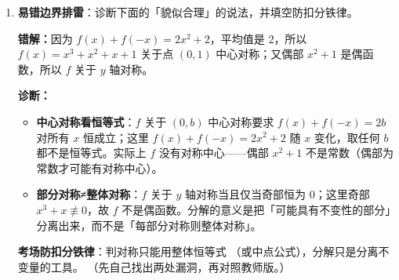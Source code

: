 \begin{tcolorbox}
\begin{enumerate}[label=(\arabic*), itemsep=4pt]
\textbf{与通法对读}：秒判示范——$y=e^x$ 的三种变身：镜像 $e^{-x}$（值域 $(0,+\infty)$ 不变、单调反转）；旋转 $-e^{-x}$（值域 $(-\infty,0)$、单调仍增）；平移 $e^{x-h}+k$（形状不变、对称身份清零）。通法负责逐条验证，表格负责直接读取；考试书写用通法，审题预判用表格。


\item \textbf{易错边界排雷}：诊断下面的「貌似合理」的说法，并填空防扣分铁律。

{\bfseries\color{red!70!black}错解：}因为 $f(x)+f(-x)=2x^2+2$，平均值是 $2$，所以 $f(x)=x^3+x^2+x+1$ 关于点 $(0,1)$ 中心对称；又偶部 $x^2+1$ 是偶函数，所以 $f$ 关于 $y$ 轴对称。

\ifteacher
{\bfseries\color{main}诊断：}
\begin{itemize}[itemsep=1pt]
\item \textbf{中心对称看恒等式}：$f$ 关于 $(0,b)$ 中心对称要求 $f(x)+f(-x)=2b$ 对所有 $x$ 恒成立；这里 $f(x)+f(-x)=2x^2+2$ 随 $x$ 变化，取任何 $b$ 都不是恒等式。实际上 $f$ 没有对称中心——偶部 $x^2+1$ 不是常数（偶部为常数才可能有对称中心）。
\item \textbf{部分对称≠整体对称}：$f$ 关于 $y$ 轴对称当且仅当奇部恒为 $0$；这里奇部 $x^3+x\not\equiv0$，故 $f$ 不是偶函数。分解的意义是把「可能具有不变性的部分」分离出来，而不是「每部分对称则整体对称」。
\end{itemize}

\textbf{考场防扣分铁律}：判对称只能用整体恒等式 （或中点公式），分解只是分离不变量的工具。
\else
{\small（先自己找出两处漏洞，再对照教师版。）}
\fi
{}
\end{enumerate}
\end{tcolorbox}

